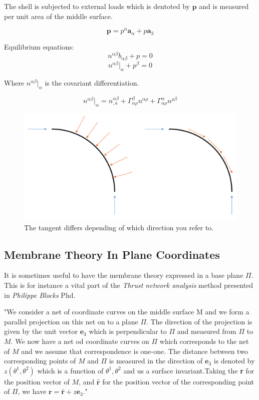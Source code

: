 The shell is subjected to external loads which is dentoted by $\textbf{p}$ and is measured per unit area of the middle surface.

\begin{equation}
\textbf{p} = p^{\alpha}\textbf{a}_\alpha +p\textbf{a}_3
\end{equation}


Equilibrium equations:
\begin{equation}
n^{\alpha \beta}b_{\alpha \beta} + p = 0
\end{equation}
\begin{equation}
n^{\alpha \beta}|_\alpha + p^\beta = 0
\end{equation}

Where $n^{\alpha \beta}|_\alpha$ is the covariant differentiation. 

\begin{equation}
n^{\alpha \beta}|_\alpha = n^{\alpha \beta}_{,a} + \Gamma^\beta_{\alpha \rho} n^{\alpha \rho} + \Gamma^\alpha_{\alpha \rho} n^{\rho \beta}
\end{equation}


\begin{figure}[H]
\centering
\includegraphics[width=0.9\linewidth ]{figure/Theory/equlibriumMem.pdf}
\caption{The tangent differs depending of which direction you refer to. }
\end{figure}

\subsection{Membrane Theory In Plane Coordinates}
It is sometimes useful to have the membrane theory expressed in a base plane $\Pi$. This is for instance a vital part of the \textit{Thrust network analysis} method presented in \textit{Philippe Blocks} Phd.

"We consider a net of coordinate curves on the middle surface M and we form a parallel projection on this net on to a plane $\Pi$. The direction of the projection is given by the unit vector $\textbf{e}_3$ which is perpendicular to $\Pi$ and measured from $\Pi$ to $M$. We now have a net od coordinate curves on $\Pi$ which corresponds to the net of $M$ and we assume that correspondence is one-one. The distance between two corresponding points of  $M$ and $\Pi$ is measured in the direction of $\textbf{e}_3$ is denoted by $z(\theta^1, \theta^2)$ which is a function of $\theta^1,\theta^2$ and us a surface invariant.Taking the \textbf{r} for the position vector of $M$, and $\hat{\textbf{r}}$ for the position vector of the corresponding point of $\Pi$, we have $\textbf{r} = \hat{\textbf{r}} + z \textbf{e}_3$."

